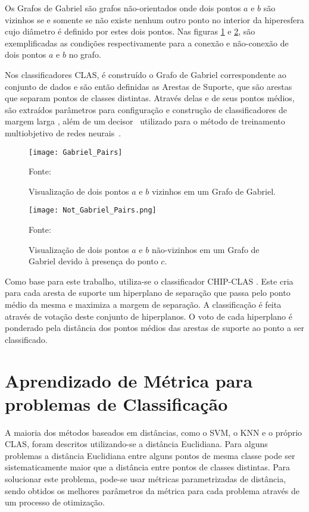 \documentclass[
	12pt,				%
	openright,			%
	twoside,			%
	a4paper,			%
	english,			%
	spanish,			%
	brazil,				%
	]{abntex2}\usepackage[]{graphicx}\usepackage[]{color}
\begin{document}
Os Grafos de Gabriel são grafos não-orientados onde dois pontos $a$ e $b$ são vizinhos se e somente se não existe nenhum outro ponto no interior da hiperesfera cujo diâmetro é definido por estes dois pontos. Nas figuras \ref{gabyes} e \ref{gabno}, são exemplificadas as condições respectivamente para a conexão e não-conexão de dois pontos $a$ e $b$ no grafo.

Nos classificadores CLAS, é construído o Grafo de Gabriel correspondente ao conjunto de dados e são então definidas as Arestas de Suporte, que são arestas que separam pontos de classes distintas. Através delas e de seus pontos médios, são extraídos parâmetros para configuração e construção de classificadores de margem larga \cite{Torres2014} \cite{Torres20152} \cite{Coelho2015}, além de um decisor~\cite{Torres2012} utilizado para o método de treinamento multiobjetivo de redes neurais~\cite{Albuquerque2000}.

\begin{figure}[ht]
\centering
\texttt{[image: Gabriel\_Pairs]}
\caption{Visualização de dois pontos $a$ e $b$ vizinhos em um Grafo de Gabriel.}
Fonte: \cite{Wikipedia Gabriel}
\label{gabyes}
\end{figure}

\begin{figure}[ht]
\centering
\texttt{[image: Not\_Gabriel\_Pairs.png]}
\caption{Visualização de dois pontos $a$ e $b$ não-vizinhos em um Grafo de Gabriel devido à presença do ponto $c$.}
Fonte: \cite{Wikipedia Gabriel}
\label{gabno}
\end{figure}

Como base para este trabalho, utiliza-se o classificador CHIP-CLAS \cite{Coelho2015}. Este cria para cada aresta de suporte um hiperplano de separação que passa pelo ponto médio da mesma e maximiza a margem de separação. A classificação é feita através de votação deste conjunto de hiperplanos. O voto de cada hiperplano é ponderado pela distância dos pontos médios das arestas de suporte ao ponto a ser classificado. \par

\section{Aprendizado de Métrica para problemas de Classificação}

A maioria dos métodos baseados em distâncias, como o SVM, o KNN e o próprio CLAS, foram descritos utilizando-se a distância Euclidiana. Para alguns problemas a distância Euclidiana entre alguns pontos de mesma classe pode ser sistematicamente maior que a distância entre pontos de classes distintas. Para solucionar este problema, pode-se usar métricas parametrizadas de distância, sendo obtidos os melhores parâmetros da métrica para cada problema através de um processo de otimização.
\end{document}

